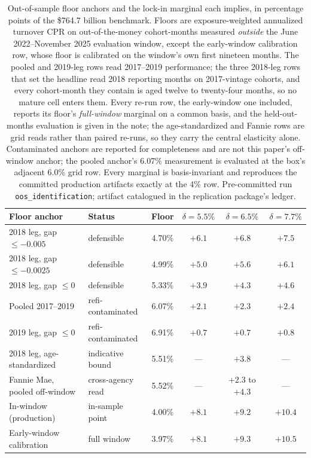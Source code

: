 \documentclass[12pt]{article}
\begin{document}
\begin{table}[!t]
\centering
\footnotesize
\begin{threeparttable}
\caption{Out-of-sample floor anchors and the lock-in marginal each implies, in percentage points of the \$764.7 billion benchmark. Floors are exposure-weighted annualized turnover CPR on out-of-the-money cohort-months measured \emph{outside} the June 2022--November 2025 evaluation window, except the early-window calibration row, whose floor is calibrated on the window's own first nineteen months. The pooled and 2019-leg rows read 2017--2019 performance; the three 2018-leg rows that set the headline read 2018 reporting months on 2017-vintage cohorts, and every cohort-month they contain is aged twelve to twenty-four months, so no mature cell enters them. Every re-run row, the early-window one included, reports its floor's \emph{full-window} marginal on a common basis, and the held-out-months evaluation is given in the note; the age-standardized and Fannie rows are grid reads rather than paired re-runs, so they carry the central elasticity alone. Contaminated anchors are reported for completeness and are not this paper's off-window anchor; the pooled anchor's 6.07\% measurement is evaluated at the box's adjacent 6.0\% grid row. Every marginal is basis-invariant and reproduces the committed production artifacts exactly at the 4\% row. Pre-committed run \texttt{oos\_identification}; artifact catalogued in the replication package's ledger.}
\label{tab:oosfloor}
\begin{tabular}{llcccc}
\toprule
Floor anchor & Status & Floor & $\delta = 5.5\%$ & $\delta = 6.5\%$ & $\delta = 7.7\%$ \\
\midrule
2018 leg, gap $\leq -0.005$ & defensible & 4.70\% & $+6.1$ & $+6.8$ & $+7.5$ \\
2018 leg, gap $\leq -0.0025$ & defensible & 4.99\% & $+5.0$ & $+5.6$ & $+6.1$ \\
2018 leg, gap $\leq 0$ & defensible & 5.33\% & $+3.9$ & $+4.3$ & $+4.6$ \\
\midrule
Pooled 2017--2019 & refi-contaminated & 6.07\% & $+2.1$ & $+2.3$ & $+2.4$ \\
2019 leg, gap $\leq 0$ & refi-contaminated & 6.91\% & $+0.7$ & $+0.7$ & $+0.8$ \\
\midrule
2018 leg, age-standardized & indicative bound\tnote{b} & 5.51\% & --- & $+3.8$ & --- \\
Fannie Mae, pooled off-window & cross-agency read\tnote{c} & 5.52\% & --- & $+2.3$ to $+4.3$ & --- \\
\midrule
In-window (production) & in-sample point & 4.00\% & $+8.1$ & $+9.2$ & $+10.4$ \\
Early-window calibration & full window\tnote{a} & 3.97\% & $+8.1$ & $+9.3$ & $+10.5$ \\
\bottomrule
\end{tabular}
\end{threeparttable}
\end{table}
\end{document}
